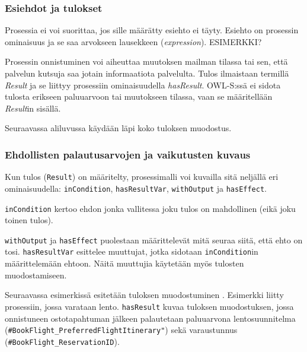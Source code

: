 \documentclass[finnish]{tktltiki2}
\theoremstyle{definition}
\theoremstyle{remark}
\begin{document}
\subsubsection{Esiehdot ja tulokset}

Prosessia ei voi suorittaa, jos sille määrätty esiehto ei täyty\cite{OWLS}. Esiehto on prosessin ominaisuus ja se saa arvokseen lausekkeen (\textit{expression}). ESIMERKKI?

Prosessin onnistuminen voi aiheuttaa muutoksen mailman tilassa tai sen, että palvelun kutsuja saa jotain informaatiota palvelulta. Tulos ilmaistaan termillä \textit{Result} ja se liittyy prosessiin ominaisuudella \textit{hasResult}. OWL-S:ssä ei sidota tulosta erikseen paluuarvoon tai muutokseen tilassa, vaan se määritellään \textit{Result}in sisällä\cite{OWLS}. 

Seuraavassa aliluvussa käydään läpi koko tuloksen muodostus.

\subsubsection{Ehdollisten palautusarvojen ja vaikutusten kuvaus}

Kun tulos (\texttt{Result}) on määritelty, prosessimalli voi kuvailla sitä neljällä eri ominaisuudella\cite{OWLS}: \texttt{inCondition}, \texttt{hasResultVar}, \texttt{withOutput} ja \texttt{hasEffect}\cite{OWLS}.  

\texttt{inCondition} kertoo ehdon jonka vallitessa joku tulos on mahdollinen (eikä joku toinen tulos). 

\texttt{withOutput} ja \texttt{hasEffect} puolestaan määrittelevät mitä seuraa siitä, että ehto on tosi. \texttt{hasResultVar} esittelee muuttujat, jotka sidotaan \texttt{inCondition}in määrittelemään ehtoon.  Näitä muuttujia käytetään myös tulosten muodostamiseen\cite{OWLS}. 

Seuraavassa esimerkissä esitetään tuloksen muodostuminen \cite{daml}. Esimerkki liitty prosessiin, jossa varataan lento. \texttt{hasResult} kuvaa tuloksen muodostuksen, jossa onnistuneen ostotapahtuman jälkeen palautetaan paluuarvona lentosuunnitelma (\texttt{\#BookFlight\_PreferredFlightItinerary"}) sekä varaustunnus (\texttt{\#BookFlight\_ReservationID}). 
\end{document}
